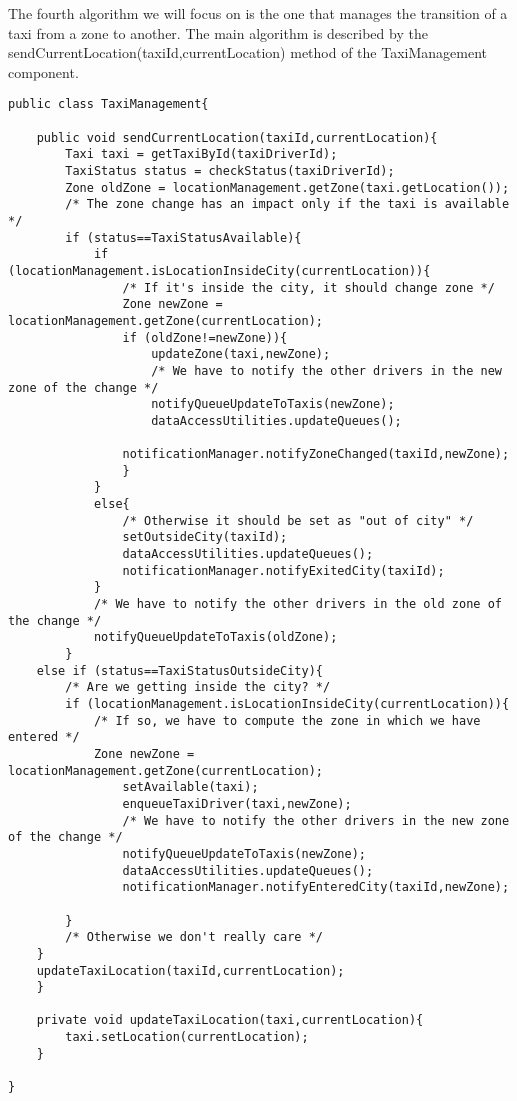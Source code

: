The fourth algorithm we will focus on is the one that manages the transition of a taxi from a zone to another. The main algorithm is described by the sendCurrentLocation(taxiId,currentLocation) method of the TaxiManagement component.

\begin{lstlisting}
public class TaxiManagement{
	
	public void sendCurrentLocation(taxiId,currentLocation){
		Taxi taxi = getTaxiById(taxiDriverId);
		TaxiStatus status = checkStatus(taxiDriverId);
		Zone oldZone = locationManagement.getZone(taxi.getLocation());
		/* The zone change has an impact only if the taxi is available */
		if (status==TaxiStatusAvailable){
			if (locationManagement.isLocationInsideCity(currentLocation)){
				/* If it's inside the city, it should change zone */
				Zone newZone = locationManagement.getZone(currentLocation);
				if (oldZone!=newZone)){
					updateZone(taxi,newZone);
					/* We have to notify the other drivers in the new zone of the change */
					notifyQueueUpdateToTaxis(newZone);
					dataAccessUtilities.updateQueues();
					
				notificationManager.notifyZoneChanged(taxiId,newZone);
				}
			}
			else{
				/* Otherwise it should be set as "out of city" */
				setOutsideCity(taxiId);
				dataAccessUtilities.updateQueues();
				notificationManager.notifyExitedCity(taxiId);
			}
			/* We have to notify the other drivers in the old zone of the change */
			notifyQueueUpdateToTaxis(oldZone);
		}
	else if (status==TaxiStatusOutsideCity){
		/* Are we getting inside the city? */
		if (locationManagement.isLocationInsideCity(currentLocation)){
			/* If so, we have to compute the zone in which we have entered */
			Zone newZone = locationManagement.getZone(currentLocation);
				setAvailable(taxi);
				enqueueTaxiDriver(taxi,newZone);
				/* We have to notify the other drivers in the new zone of the change */
				notifyQueueUpdateToTaxis(newZone);
				dataAccessUtilities.updateQueues();
				notificationManager.notifyEnteredCity(taxiId,newZone);
				
		}
		/* Otherwise we don't really care */
	}
	updateTaxiLocation(taxiId,currentLocation);
	}
	
	private void updateTaxiLocation(taxi,currentLocation){
		taxi.setLocation(currentLocation);
	}
	
}
\end{lstlisting}
